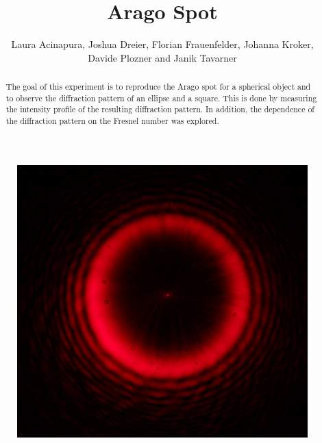 \documentclass[11pt,a4paper]{article}
\title{Arago Spot}
\author{Laura Acinapura, Joshua Dreier, Florian Frauenfelder, Johanna Kroker, \\ Davide Plozner and Janik Tavarner}
\date
\begin{document}
\maketitle

\begin{figure}[h]
    \centering
    \includegraphics[width=0.5\linewidth]{1 - Arago Spot/Images/cover-picture.png}
    \label{fig:enter-label}
\end{figure}

\begin{abstract}
The goal of this experiment is to reproduce the Arago spot for a spherical object and to observe the diffraction pattern of an ellipse and a square. This is done by measuring the intensity profile of the resulting diffraction pattern. In addition, the dependence of the diffraction pattern on the Fresnel number was explored.
\end{abstract}





\vspace{0.75cm}
\end{document}
